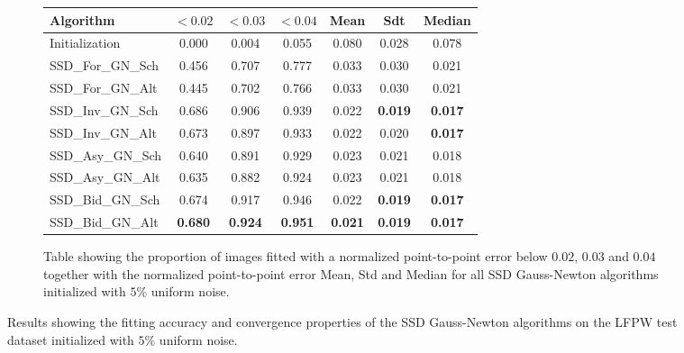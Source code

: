 \begin{figure}[p]
\begin{subfigure}{0.48\textwidth}
	    \label{fig:mean_cost_vs_iters2_ssd_gn_5}
	\end{subfigure}
	\par\bigskip\bigskip
	\begin{subfigure}{\textwidth}
		\center
		\begin{tabular}{lcccccc}
			\toprule
		    Algorithm & $<0.02$ & $<0.03$ & $<0.04$ & Mean & Sdt & Median 
		    \\
		    \midrule
		    Initialization & 0.000 & 0.004 & 0.055 & 0.080 & 0.028 & 0.078
		    \\
		    SSD\_For\_GN\_Sch & 0.456 & 0.707 & 0.777 & 0.033 & 0.030 & 0.021 
		    \\
		    SSD\_For\_GN\_Alt & 0.445 & 0.702 & 0.766 & 0.033 & 0.030 & 0.021
		    \\
		    SSD\_Inv\_GN\_Sch & 0.686 & 0.906 & 0.939 & 0.022 & \textbf{0.019} & \textbf{0.017}
		    \\
		    SSD\_Inv\_GN\_Alt & 0.673 & 0.897 & 0.933 & 0.022 & 0.020 & \textbf{0.017}
		    \\
		    SSD\_Asy\_GN\_Sch & 0.640 & 0.891 & 0.929 & 0.023 & 0.021 & 0.018
		    \\
		    SSD\_Asy\_GN\_Alt & 0.635 & 0.882 & 0.924 & 0.023 & 0.021 & 0.018
		    \\
		    SSD\_Bid\_GN\_Sch & 0.674 & 0.917 & 0.946 & 0.022 & \textbf{0.019} & \textbf{0.017}
		    \\
		    SSD\_Bid\_GN\_Alt & \textbf{0.680} & \textbf{0.924} & \textbf{0.951} & \textbf{0.021} & \textbf{0.019} & \textbf{0.017} 
		    \\
		    \bottomrule
	  	\end{tabular}
	  	\caption{Table showing the proportion of images fitted with a normalized point-to-point error below $0.02$, $0.03$ and $0.04$ together with the normalized point-to-point error Mean, Std and Median for all SSD Gauss-Newton algorithms initialized with $5\%$ uniform noise.}
	    \label{tab:stats_ssd_gn_5}
	\end{subfigure}
	\caption{Results showing the fitting accuracy and convergence properties of the SSD Gauss-Newton algorithms on the LFPW test dataset initialized with $5\%$ uniform noise.}
	\label{fig:ssd_gn_5}
\end{figure}


